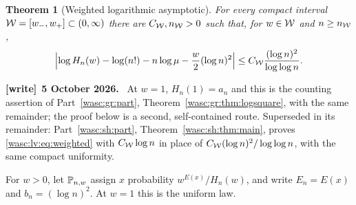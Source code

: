 \documentclass[11pt,a4paper]{article}
\newtheorem{theorem}{Theorem}[section]
\theoremstyle{remark}\newtheorem{remark}[theorem]{Remark}
\numberwithin{equation}{section}
\newenvironment{writenote}[1][]{\par\smallskip\begingroup\small
 \noindent\textbf{[write]}\if\relax\detokenize{#1}\relax\else~\textbf{#1.}\fi\ }%
 {\par\endgroup\smallskip}
\begin{document}
\begin{theorem}[Weighted logarithmic asymptotic]\label{wasc:lv:thm:weighted}
For every compact interval $\mathcal W=[w_-,w_+]\subset(0,\infty)$ there are
$C_{\mathcal W},n_{\mathcal W}>0$ such that, for $w\in\mathcal W$ and $n\ge n_{\mathcal W}$,
\begin{equation}\label{wasc:lv:eq:weighted}
\left|\log H_n(w)-\log(n!)-n\log\mu-\frac w2(\log n)^2\right|
\le C_{\mathcal W}\frac{(\log n)^2}{\log\log n}.
\end{equation}
\end{theorem}
\begin{writenote}[5 October 2026]
At $w=1$, $H_n(1)=a_n$ and this is the counting assertion of Part~\ref{wasc:gr:part}, Theorem~\ref{wasc:gr:thm:logsquare}, with the same remainder; the proof below is a second, self-contained route. Superseded in its remainder: Part~\ref{wasc:sh:part}, Theorem~\ref{wasc:sh:thm:main}, proves \eqref{wasc:lv:eq:weighted} with $C_{\mathcal W}\log n$ in place of $C_{\mathcal W}(\log n)^2/\log\log n$, with the same compact uniformity.
\end{writenote}

For $w>0$, let $\mathbb P_{n,w}$ assign $x$ probability $w^{E(x)}/H_n(w)$, and write
$E_n=E(x)$ and $b_n=(\log n)^2$. At $w=1$ this is the uniform law.
\end{document}
